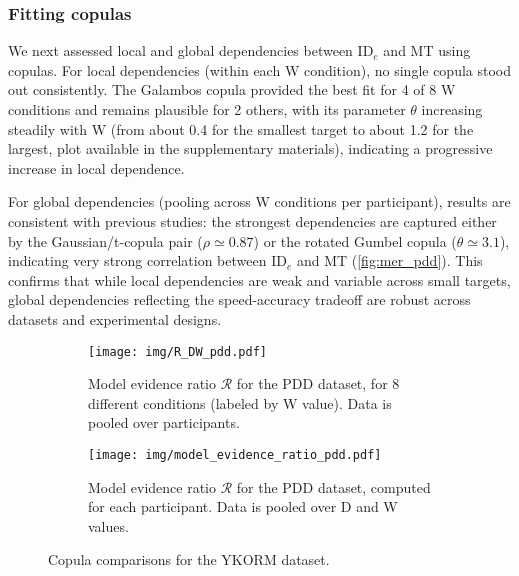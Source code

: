 \documentclass[acmlarge, manuscript,review]{acmart}
\newcommand{\ide}{\ensuremath{{\text{ID}_e}}\xspace}
\begin{document}
\subsubsection{Fitting copulas}
We next assessed local and global dependencies between \ide and MT using copulas. For local dependencies (within each W condition), no single copula stood out consistently. The Galambos copula provided the best fit for 4 of 8 W conditions and remains plausible for 2 others, with its parameter $\theta$ increasing steadily with W (from about 0.4 for the smallest target to about 1.2 for the largest, plot available in the supplementary materials), indicating a progressive increase in local dependence.

For global dependencies (pooling across W conditions per participant), results are consistent with previous studies: the strongest dependencies are captured either by the Gaussian/t-copula pair ($\rho \simeq 0.87$) or the rotated Gumbel copula ($\theta \simeq 3.1$), indicating very strong correlation between 
\ide and MT (\autoref{fig:mer_pdd}). This confirms that while local dependencies are weak and variable across small targets, global dependencies reflecting the speed-accuracy tradeoff are robust across datasets and experimental designs.


\begin{figure}[htbp]
   \centering
   \begin{subfigure}[t]{0.48\textwidth}
	   \texttt{[image: img/R\_DW\_pdd.pdf]}
	\caption{Model evidence ratio $\mathcal{R}$ for the PDD dataset, for 8 different conditions (labeled by W value). Data is pooled over participants.}
	\label{fig:R_DW_pdd}
   \end{subfigure}
   \hfill
   \begin{subfigure}[t]{0.48\textwidth}
	   \texttt{[image: img/model\_evidence\_ratio\_pdd.pdf]}
	\caption{Model evidence ratio $\mathcal{R}$ for the PDD dataset, computed for each participant. Data is pooled over D and W values.}
	\label{fig:mer_pdd}
   \end{subfigure}
\caption{Copula comparisons for the YKORM dataset.}
\label{fig:main}
\end{figure}


\end{document}
